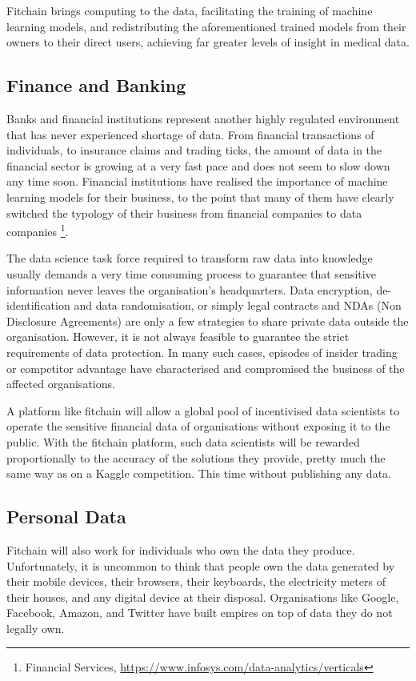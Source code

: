 \documentclass[12pt, a4paper,titlepage]{extreport}
\begin{document}
Fitchain brings computing to the data, facilitating the training of machine learning models, and redistributing the aforementioned trained models from their owners to their direct users, achieving far greater levels of insight in medical data.

\subsection{Finance and Banking}
Banks and financial institutions represent another highly regulated environment that has never experienced shortage of data. From financial transactions of individuals, to insurance claims and trading ticks, the amount of data in the financial sector is growing at a very fast pace and does not seem to slow down any time soon. 
Financial institutions have realised the importance of machine learning models for their business, to the point that many of them have clearly switched the typology of their business from financial companies to data companies \footnote{Financial Services,  \url{https://www.infosys.com/data-analytics/verticals}}. 

The data science task force required to transform raw data into knowledge usually demands a very time consuming process to guarantee that sensitive information never leaves the organisation's headquarters. Data encryption, de-identification and data randomisation, or simply legal contracts and NDAs (Non Disclosure Agreements) are only a few strategies to share private data outside the organisation. However, it is not always feasible to guarantee the strict requirements of data protection. In many such cases, episodes of insider trading or competitor advantage have characterised and compromised the business of the affected organisations.

A platform like fitchain will allow a global pool of incentivised data scientists to operate the sensitive financial data of organisations without exposing it to the public. With the fitchain platform, such data scientists will be rewarded proportionally to the accuracy of the solutions they provide, pretty much the same way as on a Kaggle \cite{kaggle} competition. This time without publishing any data.


\subsection{Personal Data}
Fitchain will also work for individuals who own the data they produce. Unfortunately, it is uncommon to think that people own the data generated by their mobile devices, their browsers, their keyboards, the electricity meters of their houses, and any digital device at their disposal. 
Organisations like Google, Facebook, Amazon, and Twitter have built empires on top of data they do not legally own.
\end{document}
